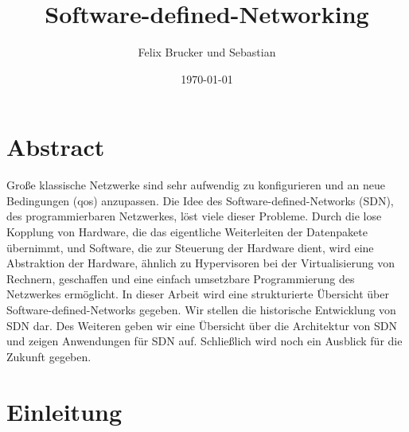 \documentclass[twoside,12pt]{scrartcl}
\title{Software-defined-Networking}
\author{Felix Brucker und Sebastian}
\date{\today}
\begin{document}
	
	
	
	\pagestyle{scrheadings}
	\clearscrheadfoot
	\ohead{\leftmark}
	\ifoot{\pagemark} 
	\setheadsepline{1pt} 
	\setfootsepline{1pt}
	
	
	\maketitle
	
	\tableofcontents
	
	\newpage
	
	\printglossary[type=\acronymtype,style=longwithindent]
	\newpage
	
	\printglossary[type=symbolslist,style=long]
	
	\newpage
	
	\section{Abstract}
	
	Große klassische Netzwerke sind sehr aufwendig zu konfigurieren und an neue Bedingungen (qos) anzupassen. Die Idee des Software-defined-Networks (SDN), des programmierbaren Netzwerkes, löst viele dieser Probleme. Durch die lose Kopplung von Hardware, die das eigentliche Weiterleiten der Datenpakete übernimmt, und Software, die zur Steuerung der Hardware dient, wird eine Abstraktion der Hardware, ähnlich zu Hypervisoren bei der Virtualisierung von Rechnern, geschaffen und eine einfach umsetzbare Programmierung des Netzwerkes ermöglicht. In dieser Arbeit wird eine strukturierte Übersicht über Software-defined-Networks gegeben. Wir stellen die historische Entwicklung von SDN dar. Des Weiteren geben wir eine Übersicht über die Architektur von SDN und zeigen Anwendungen für SDN auf. Schließlich wird noch ein Ausblick für die Zukunft gegeben.
	
	\section{Einleitung}
	

	\onehalfspacing
	
\end{document}
